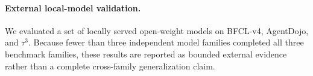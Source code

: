 \paragraph{External local-model validation.}
We evaluated a set of locally served open-weight models on BFCL-v4, AgentDojo, and $\tau^3$. Because fewer than three independent model families completed all three benchmark families, these results are reported as bounded external evidence rather than a complete cross-family generalization claim.
